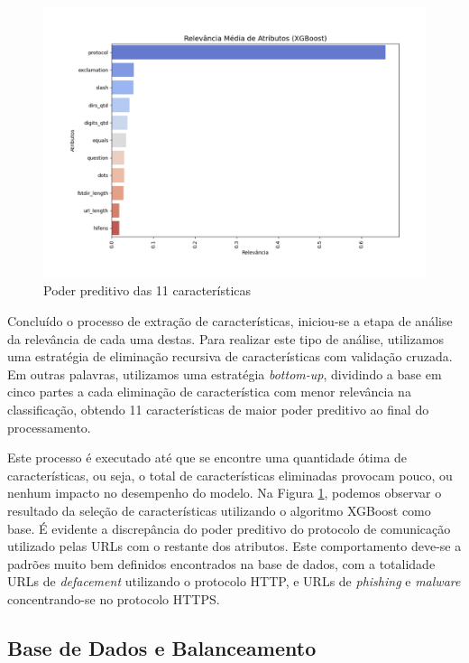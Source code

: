 \documentclass[manuscript,screen,review]{acmart}
\begin{document}
\vspace*{-1cm}
\begin{figure}[ht]
    \centering
    \includegraphics[width=1\textwidth]{pic/attr.pdf}
    \vspace*{-1cm}
    \caption{Poder preditivo das 11 características}
    \label{fig:exampleFig1}
\end{figure}

Concluído o processo de extração de características, iniciou-se a etapa de análise da relevância de cada uma destas. Para realizar este tipo de análise, utilizamos uma estratégia de eliminação recursiva de características com validação cruzada. Em outras palavras, utilizamos uma estratégia \emph{bottom-up}, dividindo a base em cinco partes a cada eliminação de característica com menor relevância na classificação, obtendo 11 características de maior poder preditivo ao final do processamento.

Este processo é executado até que se encontre uma quantidade ótima de características, ou seja, o total de características eliminadas provocam pouco, ou nenhum impacto no desempenho do modelo. Na Figura \ref{fig:exampleFig1}, podemos observar o resultado da seleção de características utilizando o algoritmo XGBoost \cite{10.1145/2939672.2939785} como base. É evidente a discrepância do poder preditivo do protocolo de comunicação utilizado pelas URLs com o restante dos atributos. Este comportamento deve-se a padrões muito bem definidos encontrados na base de dados, com a totalidade URLs de \emph{defacement} utilizando o protocolo HTTP, e URLs de \emph{phishing} e \emph{malware} concentrando-se no protocolo HTTPS.

\subsection{Base de Dados e Balanceamento}
\end{document}

